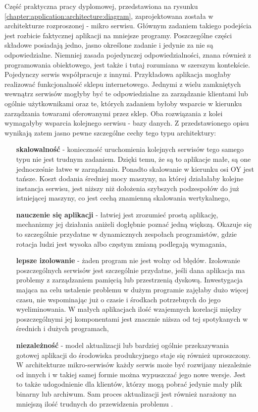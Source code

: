 Część praktyczna pracy dyplomowej, przedstawiona na rysunku
\ref{chapter:application:architecture:diagram}, zaprojektowana została w architekturze
rozproszonej - mikro serwisu. Głównym zadaniem takiego podejścia
jest rozbicie faktycznej aplikacji na mniejsze programy. Poszczególne części składowe posiadają jedno, 
jasno określone zadanie i jedynie za nie są odpowiedzialne. Niemniej zasada pojedynczej odpowiedzialności, znana również z programowania obiektowego, jest także i tutaj rozumiana w szerszym
kontekście. Pojedynczy serwis współpracuje z innymi. Przykładowa aplikacja mogłaby realizować funkcjonalność 
sklepu internetowego. Jednymi z wielu zamkniętych wewnątrz serwisów mogłyby być te odpowiedzialne za zarządzanie
klientami lub ogólnie użytkownikami oraz te, których zadaniem byłoby wsparcie w kierunku zarządzania towarami oferowanymi
przez sklep. Oba rozwiązania z kolei wymagałyby wsparcia kolejnego serwisu - bazy danych. Z przedstawionego opisu wynikają zatem jasno pewne
szczególne cechy tego typu architektury:
\begin{itemize}
    \item[\textbf{skalowalność}] - konieczność uruchomienia kolejnych serwisów tego samego typu nie jest trudnym zadaniem. Dzięki temu, 
    że są to aplikacje małe, są one jednocześnie łatwe w zarządzaniu. Ponadto skalowanie w kierunku osi OY jest tańsze. Koszt
    dodania średniej mocy maszyny, na której działałaby kolejne instancja serwisu, jest niższy niż dołożenia szybszych podzespołów
    do już istniejącej maszyny, co jest cechą znamienną skalowania wertykalnego,
    \item[\textbf{nauczenie się aplikacji}] - łatwiej jest zrozumieć prostą aplikację, mechanizmy jej działania aniżeli dogłębnie poznać
    jedną większą. Okazuje się to szczególnie przydatne w dynamicznych zespołach programistów, gdzie rotacja ludzi jest wysoka albo
    częstym zmianą podlegają wymagania,
    \item[\textbf{lepsze izolowanie}] - żaden program nie jest wolny od błędów. Izolowanie poszczególnych serwisów jest szczególnie
    przydatne, jeśli dana aplikacja ma problemy z zarządzaniem pamięcią lub przestrzenią dyskową. Inwestygacja mająca 
    na celu ustalenie problemu w dużym programie zajęłaby dużo więcej czasu, nie wspominając już o czasie i środkach potrzebnych do jego wyeliminowania.
    W małych aplikacjach ilość wzajemnych korelacji między poszczególnymi jej komponentami jest znacznie niższa od tej
    spotykanych w średnich i dużych programach,
    \item[\textbf{niezależność}] - model aktualizacji lub bardziej ogólnie przekazywania gotowej aplikacji do środowiska produkcyjnego
    staje się również uproszczony. W architekturze mikro-serwisów każdy serwis może być rozwijany niezależnie od innych i 
    w takiej samej formie można wypuszczać jego nowe wersje. Jest to także udogodnienie dla klientów, którzy mogą
    pobrać jedynie mały plik binarny lub archiwum. Sam proces aktualizacji jest również narażony na mniejszą ilość
    trudnych do przewidzenia problemu \cite{microservice_architecture}. 
\end{itemize}

